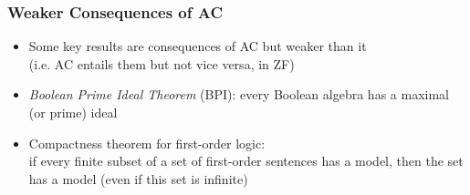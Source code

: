 \begin{frame}
\frametitle{Weaker Consequences of AC}

\begin{itemize}[<+->]

\item Some key results are consequences of AC but weaker than it \\ (i.e. AC entails them but not vice versa, in ZF)

\item \emph{Boolean Prime Ideal Theorem} (BPI): every Boolean algebra has a maximal (or prime) ideal





\item Compactness theorem for first-order logic: \\ if every finite subset of a set of first-order sentences has a model, then the set has a model (even if this set is infinite)


\end{itemize}
\end{frame}

